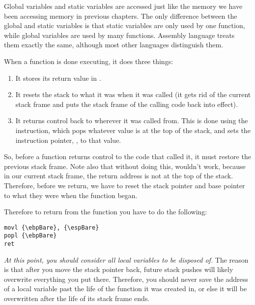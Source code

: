 Global variables and static variables are accessed just like the memory
we have been accessing memory in previous chapters.  The only difference
between the global and static variables is that static variables are 
only used by one function, while global variables are used by 
many functions. Assembly language treats them exactly the same, 
although most other languages distinguish them.

When a function is done executing, it does three things:

\begin{enumerate}\item It stores its return value in {\eaxRegIdx}. 
\item It resets the stack to what it was when it was called (it gets rid of the current stack frame and puts the stack frame of the calling code back into effect). 
\item It returns control back to wherever it was called from.  This is done using the 
 instruction, which pops whatever
value is at the top of the stack, and sets the instruction pointer, 
{\eipRegIdx}, to that value. 
\end{enumerate}

So, before a function returns control to the code that called it, it
must restore the previous stack frame.  Note also that without doing this,
 wouldn't work, because in our current stack
frame, the return address is not at the top of the stack.  Therefore, before
we return, we have to reset the stack pointer {\espRegIdx} and base pointer {\ebpRegIdx} to what they
were when the function began.

Therefore to return from the function you have to do the following:

\begin{simpletyping}
\begin{lstlisting}
movl {\ebpBare}, {\espBare}
popl {\ebpBare}
ret
\end{lstlisting}
\end{simpletyping}

\emph{At this point, you should consider all local variables to be 
disposed of.}  The reason is that after you move the stack
pointer back, future stack pushes will likely overwrite everything
you put there.  Therefore, you should never save the address
of a local variable past the life of the function it was 
created in, or else it will be overwritten after the life of its stack 
frame ends.  


